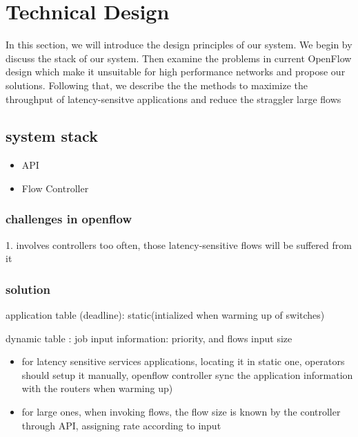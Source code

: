 \section{Technical Design}
In this section, we will introduce the design principles of our system. We begin by discuss the stack of our system. Then examine the problems in current OpenFlow design which make it unsuitable for high performance networks and propose our solutions. Following that, we describe the the methods to maximize the throughput of latency-sensitve applications and reduce the straggler large flows

\subsection{system stack}

\begin{itemize}
\item API
\item Flow Controller
\end{itemize}

\subsubsection{challenges in openflow}

1. involves controllers too often, those latency-sensitive flows will be suffered from it 


\subsubsection{solution}

application table (deadline): static(intialized when warming up of switches) 

dynamic table : job input information: priority, and flows input size

\begin{itemize}
\item for latency sensitive services applications, locating it in static one, operators should setup it manually, openflow controller sync the application information with the routers when warming up)
\item for large ones, when invoking flows, the flow size is known by the controller through API, assigning rate according to input 
\end{itemize} 




